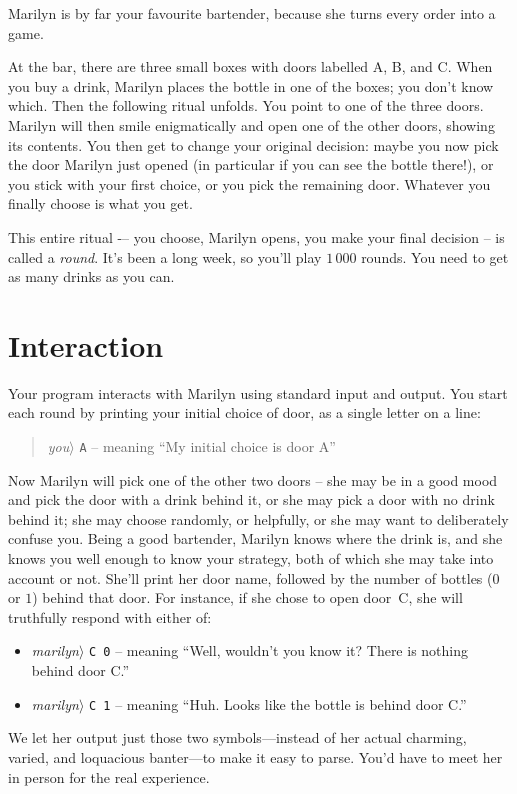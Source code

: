 


Marilyn is by far your favourite bartender, because she turns every order into a game.

At the bar, there are three small boxes with doors labelled A, B, and C.
When you buy a drink, Marilyn places the bottle in one of the boxes; you don't know which.
Then the following ritual unfolds.
You point to one of the three doors.
Marilyn will then smile enigmatically and open one of the other doors, showing its contents.
You then get to change your original decision: maybe you now pick the door Marilyn just opened (in particular if you can see the bottle there!), or you stick with your first choice, or you pick the remaining door.
Whatever you finally choose is what you get.

This entire ritual -– you choose, Marilyn opens, you make your final decision -- is called a \emph{round}.
It’s been a long week, so you’ll play $1\,000$ rounds.
You need to get as many drinks as you can.

\section*{Interaction}

Your program interacts with Marilyn using standard input and output.
You start each round by printing your initial choice of door, as a single letter on a line:
\begin{quote}\emph{you}$\rangle$ \verb|A| -- meaning ``My initial choice is door A''\end{quote}
Now Marilyn will pick one of the other two doors -- she may be in a good mood and pick the door with a drink behind it, or she may pick a door with no drink behind it; she may choose randomly, or helpfully, or she may want to deliberately confuse you.
Being a good bartender, Marilyn knows where the drink is, and she knows you well enough to know your strategy, both of which she may take into account or not.
She'll print her door name, followed by the number of bottles ($0$ or $1$) behind that door.
For instance, if she chose to open door~C, she will truthfully respond with  either of:
\begin{itemize}
  \item
\emph{marilyn}$\rangle$ \verb|C 0| -- meaning ``Well, wouldn't you know it? There is nothing behind door C.''
\item
  \emph{marilyn}$\rangle$ \verb|C 1| -- meaning ``Huh. Looks like the bottle is behind door C.''
\end{itemize}
We let her output just those two symbols---instead of her actual charming, varied, and loquacious banter---to make it easy to parse.
You'd have to meet her in person for the real experience.

